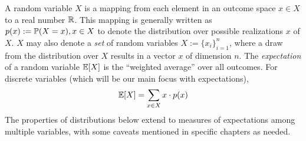 
A random variable $X$ is a mapping from each element in an outcome space $x \in X$ to a real number $\mathbb{R}$. This mapping is generally written as $p(x):=\mathbb{P}(X=x), x \in X$ to denote the distribution over possible realizations $x$ of $X$. $X$ may also denote a \textit{set} of random variables $X:=\{x_i\}_{i=1}^n$, where a draw from the distribution over $X$ results in a vector $x$ of dimension $n$.
The \textit{expectation} of a random variable $\mathbb{E}[X]$ is the ``weighted average'' over all outcomes. For discrete variables (which will be our main focus with expectations), 
\begin{align}
\mathbb{E}[X] = \sum_{x\in X} x\cdot p(x)
\end{align}
The properties of distributions below extend to measures of expectations among multiple variables, with some caveats mentioned in specific chapters as needed.

